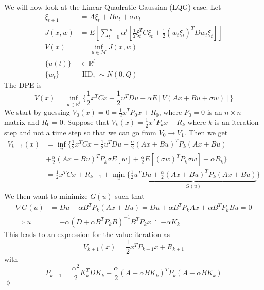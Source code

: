 \documentclass[lecture,12pt,]{pcms-l}
\begin{document}
\begin{example}
We will now look at the Linear Quadratic Gaussian (LQG) case. Let
\begin{align*}
\xi_{t+1} &= A\xi_t+Bu_t+\sigma w_t \\
J(x,w) &= E[\sum_{t=0}^\infty \alpha^t[\frac{1}{2}\xi_t^TC\xi_t + \frac{1}{2}(w_t\xi_t)^TDw_t\xi_t]] \\
V(x) &= \inf_{\mu\in\mathcal{M}}J(x,w) \\
\{u(t)\} &\in\mathbb{R}^l \\
\{w_t\} & \text{ IID, } \sim N(0,Q)
\end{align*}
The DPE is
$$V(x) = \inf_{u\in\mathbb{R}^l}\{\frac{1}{2}x^TCx + \frac{1}{2}u^TDu + \alpha E[V(Ax+Bu+\sigma w)]\}$$
We start by guessing $V_0(x)=0 = \frac{1}{2}x^TP_0x+R_0$, where $P_0=0$ is an $n\times n$ matrix and $R_0=0$. Suppose that $V_k(x) = \frac{1}{2}x^TP_kx+R_k$ where $k$ is an iteration step and not a time step so that we can go from $V_0\to V_1$. Then we get
\begin{align*}
V_{k+1}(x) &= \inf_u\{\frac{1}{2}x^TCx+\frac{1}{2}u^TDu + \frac{\alpha}{2}(Ax+Bu)^TP_k(Ax+Bu) \\
&+ \frac{\alpha}{2}(Ax+Bu)^TP_k\sigma E[w] + \frac{\alpha}{2}E[(\sigma w)^TP_k\sigma w] + \alpha R_k\} \\
&= \frac{1}{2}x^TCx + R_{k+1} + \min_u\{\underbrace{\frac{1}{2}u^TDu + \frac{\alpha}{2}(Ax+Bu)^TP_k(Ax+Bu)}_{G(u)}\}
\end{align*}
We then want to minimize $G(u)$ such that
\begin{align*}
\nabla G(u) &= Du+\alpha B^TP_k(Ax+Bu) = Du + \alpha B^TP_kAx + \alpha B^TP_kBu = 0 \\
\Rightarrow u &= -\alpha(D+\alpha B^TP_kB)^{-1}B^TP_kx \doteq -\alpha K_k
\end{align*}
This leads to an expression for the value iteration as
$$V_{k+1}(x) = \frac{1}{2}x^TP_{k+1}x + R_{k+1}$$
with
$$P_{k+1} = \frac{\alpha^2}{2}K_k^TDK_k + \frac{\alpha}{2}(A-\alpha BK_k)^TP_k(A-\alpha BK_k)$$
$\lozenge$
\end{example}
\end{document}
